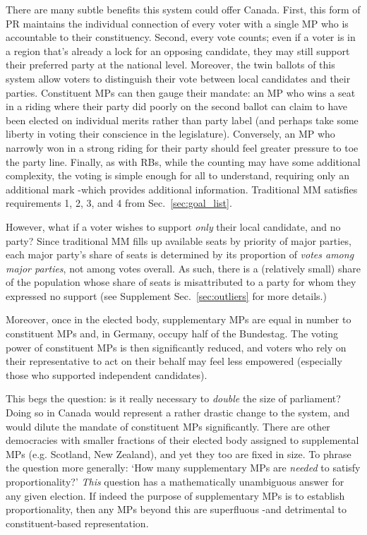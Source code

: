 There are many subtle benefits this system could offer Canada.
First, this form of PR maintains the individual connection of every voter with a single MP who is accountable to their constituency.
Second, every vote counts; even if a voter is in a region that's already a lock for an opposing candidate, they may still support their preferred party at the national level.
Moreover, the twin ballots of this system allow voters to distinguish their vote between local candidates and their parties.
Constituent MPs can then gauge their mandate: an MP who wins a seat in a riding where their party did poorly on the second ballot can claim to have been elected on individual merits rather than party label (and perhaps take some liberty in voting their conscience in the legislature). Conversely, an MP who narrowly won in a strong riding for their party should feel greater pressure to toe the party line.
Finally, as with RBs, while the counting may have some additional complexity, the voting is simple enough for all to understand, requiring only an additional mark \--which provides additional information. Traditional MM satisfies requirements 1, 2, 3, and 4 from Sec.~\ref{sec:goal_list}.

However, what if a voter wishes to support \emph{only} their local candidate, and no party? Since traditional MM fills up available seats by priority of major parties, each major party's share of seats is determined by its proportion of \emph{votes among major parties}, not among votes overall. As such, there is a (relatively small) share of the population whose share of seats is misattributed to a party for whom they expressed no support (see Supplement Sec.~\ref{sec:outliers} for more details.)

Moreover, once in the elected body, supplementary MPs are equal in number to constituent MPs and, in Germany, occupy half of the Bundestag.
The voting power of constituent MPs is then significantly reduced, and voters who rely on their representative to act on their behalf may feel less empowered (especially those who supported independent candidates).

This begs the question: is it really necessary to \emph{double} the size of parliament? Doing so in Canada would represent a rather drastic change to the system, and would dilute the mandate of constituent MPs significantly.
There are other democracies with smaller fractions of their elected body assigned to supplemental MPs (e.g. Scotland, New Zealand), and yet they too are fixed in size.
To phrase the question more generally: `How many supplementary MPs are \emph{needed} to satisfy proportionality?'
\emph{This} question has a mathematically unambiguous answer for any given election.
If indeed the purpose of supplementary MPs is to establish proportionality, then any MPs beyond this are superfluous \--and detrimental to constituent-based representation.

